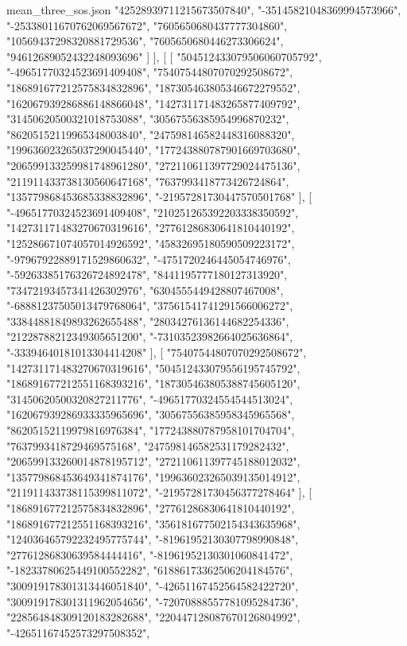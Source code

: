 \begin{filecontents*}[overwrite]{mean_three_sos.json}
    "42528939711215673507840",
    "-35145821048369994573966",
    "-25338011670762069567672",
    "7605650680437777304860",
    "10569437298320881729536",
    "7605650680446273306624",
    "94612689052432248093696"
   ]
  ],
  [
   [
    "504512433079506060705792",
    "-49651770324523691409408",
    "75407544807070292508672",
    "186891677212575834832896",
    "187305463805346672279552",
    "162067939286886148866048",
    "142731171483265877409792",
    "31450620500321018753088",
    "30567556385954996870232",
    "86205152119965348003840",
    "247598146582448316088320",
    "199636023265037290045440",
    "177243880787901669703680",
    "206599133259981748961280",
    "272110611397729024475136",
    "211911433738130560647168",
    "7637993418773426724864",
    "135779868453685338832896",
    "-21957281730447570501768"
   ],
   [
    "-49651770324523691409408",
    "210251265392203338350592",
    "142731171483270670319616",
    "27761286830641810440192",
    "125286671074057014926592",
    "45832695180590509223172",
    "-97967922889171529860632",
    "-4751720246445054746976",
    "-59263385176326724892478",
    "8441195777180127313920",
    "73472193457341426302976",
    "6304555449428807467008",
    "-68881237505013479768064",
    "37561541741291566006272",
    "33844881849893262655488",
    "28034276136144682254336",
    "21228788212349305651200",
    "-73103523982664025636864",
    "-33394640181013304414208"
   ],
   [
    "75407544807070292508672",
    "142731171483270670319616",
    "504512433079556195745792",
    "186891677212551168393216",
    "187305463805388745605120",
    "31450620500320827211776",
    "-49651770324554544513024",
    "162067939286933335965696",
    "30567556385958345965568",
    "86205152119979816976384",
    "177243880787958101704704",
    "7637993418729469575168",
    "247598146582531179282432",
    "206599133260014878195712",
    "272110611397745188012032",
    "135779868453649341874176",
    "199636023265039135014912",
    "211911433738115399811072",
    "-21957281730456377278464"
   ],
   [
    "186891677212575834832896",
    "27761286830641810440192",
    "186891677212551168393216",
    "356181677502154343635968",
    "124036465792232495775744",
    "-81961952130307798990848",
    "27761286830639584444416",
    "-81961952130301060841472",
    "-18233780625449100552282",
    "61886173362506204184576",
    "300919178301313446051840",
    "-42651167452564582422720",
    "300919178301311962054656",
    "-72070888557781095284736",
    "228564848309120183282688",
    "220447128087670126804992",
    "-42651167452573297508352",

\end{filecontents*}
